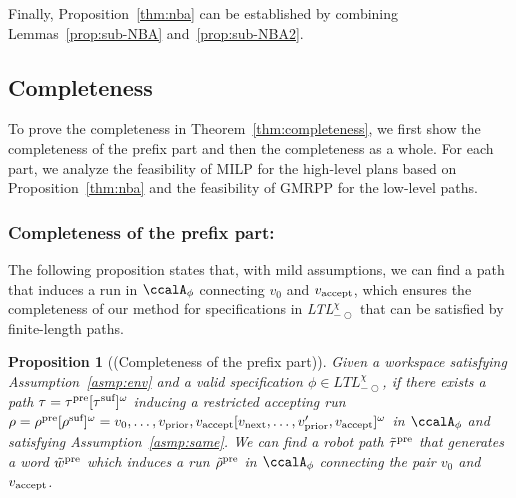 \documentclass[Afour,sageh,times]{sagej}
\newtheorem{prop}[thm]{Proposition}
\newcommand{\ltlx}{ {\it LTL}$_{-\bigcirc}^\chi$ }
\newcommand{\autop}{\ccalA_{\phi}}
\newcommand{\vertex}[1]{v_{\textup{#1}}}
\begin{document}
{{ Finally, Proposition~\ref{thm:nba} can be established by combining Lemmas~\ref{prop:sub-NBA} and~\ref{prop:sub-NBA2}.

\subsection{Completeness}\label{app:completeness}
To prove the completeness in Theorem~\ref{thm:completeness}, we first show the completeness of the prefix part and then the completeness as a whole. For each part, we analyze the feasibility of MILP for the high-level plans based on Proposition~\ref{thm:nba} and the feasibility of GMRPP for the low-level paths.
\subsubsection{Completeness of the prefix part:}
The following proposition states that, with mild assumptions, we can find a path that induces a run in $\autop$ connecting  $v_0$ and $\vertex{accept}$, which ensures the completeness of our method for specifications in \ltlx that can be satisfied by finite-length paths.
\begin{prop}[(Completeness of the prefix part)]\label{thm:prefix}
Given a workspace satisfying Assumption~\ref{asmp:env} and a valid specification $\phi\in \textit{LTL}_{-\bigcirc}^\chi$, if there exists a path $\tau = \tau^\textup{pre} [\tau^\textup{suf}]^\omega$  inducing a restricted accepting run $\rho =  \rho^\textup{pre} [\rho^\textup{suf}]^\omega = v_0, \ldots, \vertex{prior}, \vertex{accept} [\vertex{next}, \ldots, \vertex{prior}', \vertex{accept}]^\omega$ in $\autop$ and satisfying Assumption~\ref{asmp:same}. We can find a robot path $\tilde{\tau}^{\textup{pre}}$ that generates a word $\tilde{w}^{\textup{pre}}$ which induces a run $\tilde{\rho}^{\textup{pre}}$ in $\autop$  connecting the pair $v_0$ and $\vertex{accept}$. %
\end{prop}
}}
\end{document}
